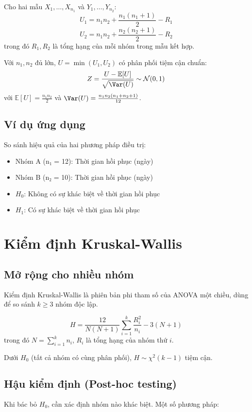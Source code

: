 \begin{dn}
Cho hai mẫu $X_1, \ldots, X_{n_1}$ và $Y_1, \ldots, Y_{n_2}$:
\[
U_1 = n_1 n_2 + \frac{n_1(n_1+1)}{2} - R_1
\]
\[
U_2 = n_1 n_2 + \frac{n_2(n_2+1)}{2} - R_2
\]
trong đó $R_1, R_2$ là tổng hạng của mỗi nhóm trong mẫu kết hợp.
\end{dn}

\begin{tinhchat}
Với $n_1, n_2$ đủ lớn, $U = \min(U_1, U_2)$ có phân phối tiệm cận chuẩn:
\[
Z = \frac{U - \mathbb{E}[U]}{\sqrt{\Var(U)}} \sim \mathcal{N}(0,1)
\]
với $\mathbb{E}[U] = \frac{n_1 n_2}{2}$ và $\Var(U) = \frac{n_1 n_2 (n_1 + n_2 + 1)}{12}$.
\end{tinhchat}

\subsection{Ví dụ ứng dụng}
So sánh hiệu quả của hai phương pháp điều trị:
\begin{itemize}
    \item Nhóm A (n₁ = 12): Thời gian hồi phục (ngày)
    \item Nhóm B (n₂ = 10): Thời gian hồi phục (ngày)
    \item $H_0$: Không có sự khác biệt về thời gian hồi phục
    \item $H_1$: Có sự khác biệt về thời gian hồi phục
\end{itemize}

\section{Kiểm định Kruskal-Wallis}

\subsection{Mở rộng cho nhiều nhóm}
Kiểm định Kruskal-Wallis là phiên bản phi tham số của ANOVA một chiều, dùng để so sánh $k \geq 3$ nhóm độc lập.

\begin{dn}
\[
H = \frac{12}{N(N+1)} \sum_{i=1}^k \frac{R_i^2}{n_i} - 3(N+1)
\]
trong đó $N = \sum_{i=1}^k n_i$, $R_i$ là tổng hạng của nhóm thứ $i$.
\end{dn}

Dưới $H_0$ (tất cả nhóm có cùng phân phối), $H \sim \chi^2(k-1)$ tiệm cận.

\subsection{Hậu kiểm định (Post-hoc testing)}
Khi bác bỏ $H_0$, cần xác định nhóm nào khác biệt. Một số phương pháp:

